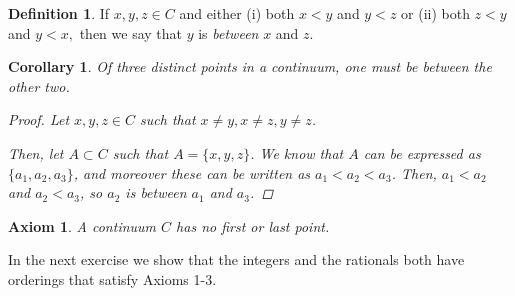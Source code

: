 \documentclass[11pt]{article}
\renewcommand{\_}[1]{\underline{ #1 }}
\newtheorem{corollary}[theorem]{Corollary}
\newtheorem{axiom}{Axiom}
\theoremstyle{definition}
\newtheorem{definition}[theorem]{Definition}
\numberwithin{equation}{subsection}
\begin{document}
\begin{definition}  If $x, y, z \in C$ and either (i) both $x < y$ and $y < z$ or (ii) both $z<y$ and $y<x,$ then we say that $y$ is \emph{between} $x$ and $z$.
\end{definition}

\begin{corollary}  Of three distinct points in a continuum, one must be between the other two.

\begin{proof}
Let $x,y,z \in C$ such that $x \not=y, x \not=z, y \not=z$. 

Then, let $A \subset C$ such that $A = \{x,y,z\}$. We know that $A$ can be expressed as $\{a_1,a_2,a_3\}$, and moreover these can be written as $a_1 < a_2 < a_3$. Then, $a_1 < a_2$ and $a_2 < a_3$, so $a_2$ is between $a_1$ and $a_3$.

\renewcommand\qedsymbol{QED}
\end{proof}

\end{corollary}

\begin{axiom} A continuum $C$ has no first or last point.
\end{axiom}


In the next exercise we show that the integers and the rationals both have orderings that satisfy Axioms 1-3.
\end{document}
